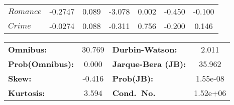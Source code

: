 \begin{center}
\begin{tabular}{lcccccc}
                    \textbf{$Romance$}               & -0.2747       & 0.089            & -3.078     & 0.002               & -0.450          & -0.100          \\
                    \textbf{$Crime$}                 & -0.0274       & 0.088            & -0.311     & 0.756               & -0.200          & 0.146           \\
                    \bottomrule
                \end{tabular}
                \begin{tabular}{lclc}
                    \textbf{Omnibus:}       & 30.769 & \textbf{  Durbin-Watson:     } & 2.011    \\
                    \textbf{Prob(Omnibus):} & 0.000  & \textbf{  Jarque-Bera (JB):  } & 35.962   \\
                    \textbf{Skew:}          & -0.416 & \textbf{  Prob(JB):          } & 1.55e-08 \\
                    \textbf{Kurtosis:}      & 3.594  & \textbf{  Cond.~No.          } & 1.52e+06 \\
                    \bottomrule
                \end{tabular}
            \end{center}
